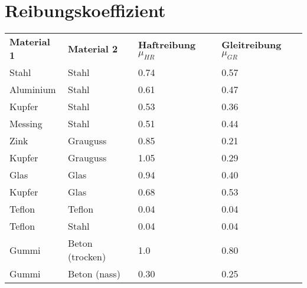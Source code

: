 



\section{Reibungskoeffizient}
\begin{footnotesize}
\begin{longtable}{llll}
  \rowcolor{white} \textbf{Material 1} & \textbf{Material 2} 
  & \textbf{Haftreibung $\mu_{HR}$} & \textbf{Gleitreibung $\mu_{GR}$}\\
  \rowcolor{lgray}  Stahl     & Stahl             & 0.74 & 0.57\\
  \rowcolor{white}  Aluminium & Stahl             & 0.61 & 0.47\\
  \rowcolor{lgray}  Kupfer    & Stahl             & 0.53 & 0.36\\
  \rowcolor{white}  Messing   & Stahl             & 0.51 & 0.44\\
  \rowcolor{lgray}  Zink      & Grauguss          & 0.85 & 0.21\\
  \rowcolor{white}  Kupfer    & Grauguss          & 1.05 & 0.29\\
  \rowcolor{lgray}  Glas      & Glas              & 0.94 & 0.40\\
  \rowcolor{white}  Kupfer    & Glas              & 0.68 & 0.53\\
  \rowcolor{lgray}  Teflon    & Teflon            & 0.04 & 0.04\\
  \rowcolor{white}  Teflon    & Stahl             & 0.04 & 0.04\\
  \rowcolor{lgray}  Gummi     & Beton (trocken)   & 1.0  & 0.80\\
  \rowcolor{white}  Gummi     & Beton (nass)      & 0.30 & 0.25
\end{longtable}
\end{footnotesize}